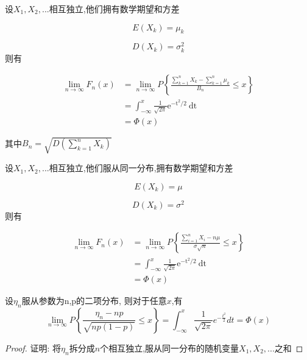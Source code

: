 \begin{theorem}[Lyapunov中心极限定理]
    设$X_1,X_2,...$相互独立,他们拥有数学期望和方差

$$
 E(X_k) = \mu_k
$$

$$
  D(X_k) = \sigma_k^2
$$
则有

$$
\begin{aligned} \lim _{n \rightarrow \infty} F_{n}(x) &=\lim _{n \rightarrow \infty} P\left\{\frac{\sum_{k=1}^{n} X_{k}-\sum_{k=1}^{n} \mu_{k}}{B_{n}} \leq x\right\}
\\ &=\int_{-\infty}^{x} \frac{1}{\sqrt{2 \pi}} \mathrm{e}^{-\mathrm{t}^{2} / 2} \mathrm{~d} \mathrm{t}
\\&=\Phi(x)
 \end{aligned}
 $$

其中$B_n=\sqrt{D\left(\sum_{k=1}^{n} X_{k}\right)}$
\end{theorem}

\begin{theorem}
    设$X_1,X_2,...$相互独立,他们服从同一分布,拥有数学期望和方差

$$
 E(X_k) = \mu
$$

$$
  D(X_k) = \sigma^2
$$
则有

$$\begin{aligned}
\lim _{n \rightarrow \infty} F_{n}(x)&=\lim _{n \rightarrow \infty} P\left\{\frac{\sum_{i=1}^{n} X_{i}-n \mu}{\sigma \sqrt{n}} \leq x\right\}
\\ &=\int_{-\infty}^{x} \frac{1}{\sqrt{2 \pi}} \mathrm{e}^{-\mathrm{t}^{2} / 2} \mathrm{~d} \mathrm{t}
\\&=\Phi(x)
\end{aligned}
$$
\end{theorem}

\begin{theorem}
设$\eta_{n}$服从参数为n,p的二项分布, 则对于任意$x$,有
$$
\lim _{n \rightarrow \infty} P\left\{\frac{\eta_{n}-n p}{\sqrt{n p(1-p)}} \leq x\right\}=\int_{-\infty}^{x} \frac{1}{\sqrt{2 \pi}} e^{-\frac{t^{2}}{2}} d t=\Phi(x)
$$
\end{theorem}

\begin{proof}
    证明: 将$\eta_{n}$拆分成$n$个相互独立,服从同一分布的随机变量$X_1,X_2,...$之和
\end{proof}


